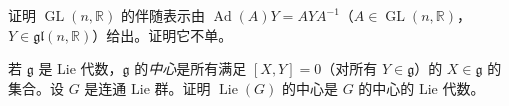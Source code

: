 \documentclass[../../main.tex]{subfiles}
\begin{document}
\begin{exercise}\label{exercise:ch20-21}
证明 $\operatorname{GL}(n,\mathbb{R})$ 的伴随表示由 $\operatorname{Ad}(A)Y=AYA^{-1}$（$A\in\operatorname{GL}(n,\mathbb{R})$，$Y\in\mathfrak{gl}(n,\mathbb{R})$）给出。证明它不单。
\end{exercise}

\begin{exercise}\label{exercise:ch20-22}
若 $\mathfrak g$ 是 Lie 代数，$\mathfrak g$ 的\emph{中心}是所有满足 $[X,Y]=0$（对所有 $Y\in\mathfrak g$）的 $X\in\mathfrak g$ 的集合。设 $G$ 是连通 Lie 群。证明 $\operatorname{Lie}(G)$ 的中心是 $G$ 的中心的 Lie 代数。
\end{exercise}
\end{document}
